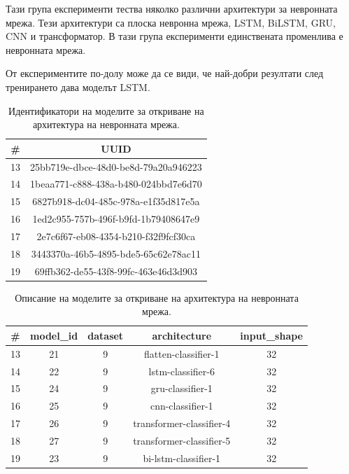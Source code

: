 \documentclass{article}
\begin{document}
Тази група експерименти тества няколко различни архитектури за невронната мрежа. Тези архитектури са плоска невронна
мрежа, LSTM, BiLSTM, GRU, CNN и трансформатор. В тази група експерименти единствената променлива е невронната мрежа.

От експериментите по-долу може да се види, че най-добри резултати след тренирането дава моделът LSTM.

\begin{table}[H]
\centering
\captionsetup{justification=centering}
\begin{tabular}{|c||c|}
\hline
\# & UUID\\
\hline
13 & 25bb719e-dbce-48d0-be8d-79a20a946223\\
14 & 1beaa771-c888-438a-b480-024bbd7e6d70\\
15 & 6827b918-dc04-485c-978a-e1f35d817e5a\\
16 & 1ed2c955-757b-496f-b9fd-1b79408647e9\\
17 & 2e7c6f67-eb08-4354-b210-f32f9fcf30ca\\
18 & 3443370a-46b5-4895-bde5-65c62e78ac11\\
19 & 69ffb362-de55-43f8-99fc-463e46d3d903\\
\hline
\end{tabular}
\caption{Идентификатори на моделите за откриване на архитектура на невронната мрежа.}
\end{table}

\begin{table}[H]
\centering
\captionsetup{justification=centering}
\begin{tabular}{|c||c|c|c|c|}
\hline
\# & model\_id & dataset & architecture & input\_shape\\
\hline
13 & 21 & 9 & flatten-classifier-1 & 32\\
14 & 22 & 9 & lstm-classifier-6 & 32\\
15 & 24 & 9 & gru-classifier-1 & 32\\
16 & 25 & 9 & cnn-classifier-1 & 32\\
17 & 26 & 9 & transformer-classifier-4 & 32\\
18 & 27 & 9 & transformer-classifier-5 & 32\\
19 & 23 & 9 & bi-lstm-classifier-1 & 32\\
\hline
\end{tabular}
\caption{Описание на моделите за откриване на архитектура на невронната мрежа.}
\end{table}
\end{document}
